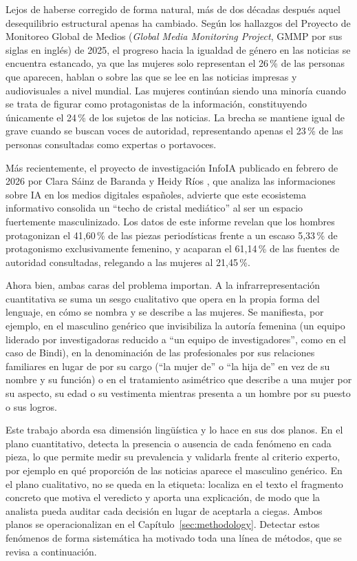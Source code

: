 Lejos de haberse corregido de forma natural, más de dos décadas después aquel desequilibrio estructural apenas ha cambiado. Según los hallazgos del Proyecto de Monitoreo Global de Medios (\textit{Global Media Monitoring Project}, GMMP por sus siglas en inglés) \cite{unwomen2025gmmp} de 2025, el progreso hacia la igualdad de género en las noticias se encuentra estancado, ya que las mujeres solo representan el 26\,\% de las personas que aparecen, hablan o sobre las que se lee en las noticias impresas y audiovisuales a nivel mundial. Las mujeres continúan siendo una minoría cuando se trata de figurar como protagonistas de la información, constituyendo únicamente el 24\,\% de los sujetos de las noticias. La brecha se mantiene igual de grave cuando se buscan voces de autoridad, representando apenas el 23\,\% de las personas consultadas como expertas o portavoces.

Más recientemente, el proyecto de investigación InfoIA publicado en febrero de 2026 por Clara Sáinz de Baranda y Heidy Ríos \cite{sainzdebaranda2026}, que analiza las informaciones sobre IA en los medios digitales españoles, advierte que este ecosistema informativo consolida un ``techo de cristal mediático'' al ser un espacio fuertemente masculinizado. Los datos de este informe revelan que los hombres protagonizan el 41,60\,\% de las piezas periodísticas frente a un escaso 5,33\,\% de protagonismo exclusivamente femenino, y acaparan el 61,14\,\% de las fuentes de autoridad consultadas, relegando a las mujeres al 21,45\,\%. 

Ahora bien, ambas caras del problema importan. A la infrarrepresentación cuantitativa se suma un sesgo cualitativo que opera en la propia forma del lenguaje, en cómo se nombra y se describe a las mujeres. Se manifiesta, por ejemplo, en el masculino genérico que invisibiliza la autoría femenina (un equipo liderado por investigadoras reducido a ``un equipo de investigadores'', como en el caso de Bindi), en la denominación de las profesionales por sus relaciones familiares en lugar de por su cargo (``la mujer de'' o ``la hija de'' en vez de su nombre y su función) o en el tratamiento asimétrico que describe a una mujer por su aspecto, su edad o su vestimenta mientras presenta a un hombre por su puesto o sus logros.

Este trabajo aborda esa dimensión lingüística y lo hace en sus dos planos. En el plano cuantitativo, detecta la presencia o ausencia de cada fenómeno en cada pieza, lo que permite medir su prevalencia y validarla frente al criterio experto, por ejemplo en qué proporción de las noticias aparece el masculino genérico. En el plano cualitativo, no se queda en la etiqueta: localiza en el texto el fragmento concreto que motiva el veredicto y aporta una explicación, de modo que la analista pueda auditar cada decisión en lugar de aceptarla a ciegas. Ambos planos se operacionalizan en el Capítulo~\ref{sec:methodology}. Detectar estos fenómenos de forma sistemática ha motivado toda una línea de métodos, que se revisa a continuación.



